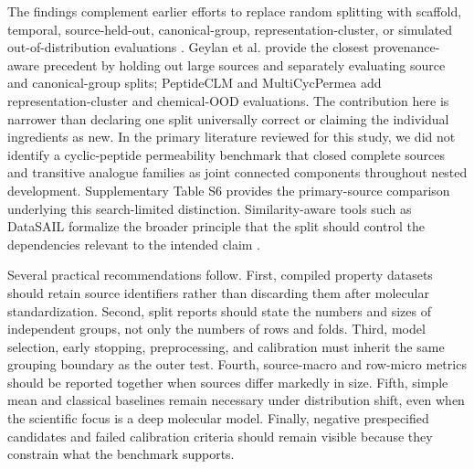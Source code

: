 \documentclass[referee,lineno,pdflatex,sn-vancouver-num]{sn-jnl}
\begin{document}
The findings complement earlier efforts to replace random splitting with scaffold, temporal, source-held-out, canonical-group, representation-cluster, or simulated out-of-distribution evaluations \cite{wu2018moleculenet,sheridan2013timesplit,landrum2023simpd,geyland2024applicability,feller2025peptideclm,liu2025benchmark,wang2025multicycpermea}. Geylan et al. provide the closest provenance-aware precedent by holding out large sources and separately evaluating source and canonical-group splits; PeptideCLM and MultiCycPermea add representation-cluster and chemical-OOD evaluations. The contribution here is narrower than declaring one split universally correct or claiming the individual ingredients as new. In the primary literature reviewed for this study, we did not identify a cyclic-peptide permeability benchmark that closed complete sources and transitive analogue families as joint connected components throughout nested development. Supplementary Table S6 provides the primary-source comparison underlying this search-limited distinction. Similarity-aware tools such as DataSAIL formalize the broader principle that the split should control the dependencies relevant to the intended claim \cite{kalinina2025datasail}.

Several practical recommendations follow. First, compiled property datasets should retain source identifiers rather than discarding them after molecular standardization. Second, split reports should state the numbers and sizes of independent groups, not only the numbers of rows and folds. Third, model selection, early stopping, preprocessing, and calibration must inherit the same grouping boundary as the outer test. Fourth, source-macro and row-micro metrics should be reported together when sources differ markedly in size. Fifth, simple mean and classical baselines remain necessary under distribution shift, even when the scientific focus is a deep molecular model. Finally, negative prespecified candidates and failed calibration criteria should remain visible because they constrain what the benchmark supports.
\end{document}
